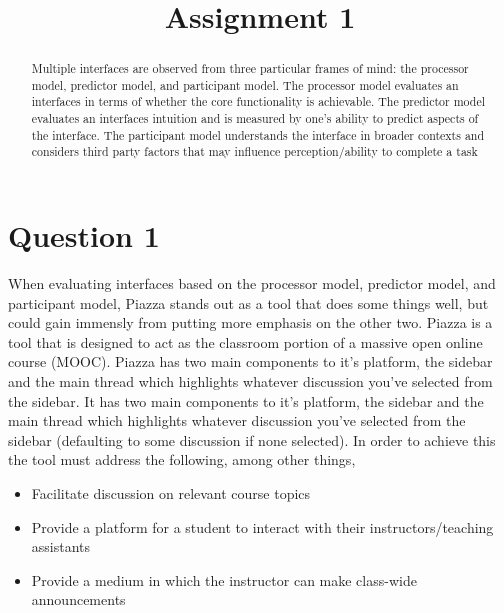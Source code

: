 

\title{Assignment 1\\}



\maketitle

\begin{abstract}
Multiple interfaces are observed from three particular frames of mind: the processor model, predictor model, and participant model. The processor model evaluates an interfaces in terms of whether the core functionality is achievable. The predictor model evaluates an interfaces intuition and is measured by one's ability to predict aspects of the interface. The participant model understands the interface in broader contexts and considers third party factors that may influence perception/ability to complete a task
\end{abstract}

\section{Question 1}
When evaluating interfaces based on the processor model, predictor model, and participant model, Piazza stands out as a tool that does some things well, but could gain immensly from putting more emphasis on the other two. Piazza is a tool that is designed to act as the classroom portion of a massive open online course (MOOC). Piazza has two main components to it's platform, the sidebar and the main thread which highlights whatever discussion you've selected from the sidebar. It has two main components to it's platform, the sidebar and the main thread which highlights whatever discussion you've selected from the sidebar (defaulting to some discussion if none selected). In order to achieve this the tool must address the following, among other things,

\begin{itemize}
\item
  Facilitate discussion on relevant course topics
\item
  Provide a platform for a student to interact with their instructors/teaching assistants
\item
  Provide a medium in which the instructor can make class-wide announcements
\end{itemize}

